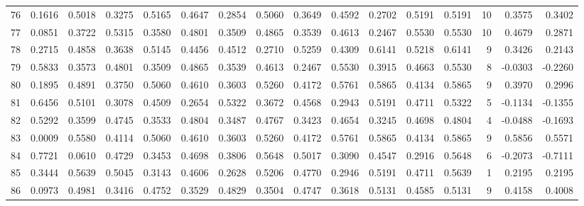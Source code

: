 \begin{tabular}{lrrrrrrrrrrrrrrr}
76  &      0.1616 &  0.5018 &  0.3275 &  0.5165 &  0.4647 &  0.2854 &  0.5060 &  0.3649 &  0.4592 &  0.2702 &   0.5191 &     0.5191 &     10 &                    0.3575 &                     0.3402 \\
77  &      0.0851 &  0.3722 &  0.5315 &  0.3580 &  0.4801 &  0.3509 &  0.4865 &  0.3539 &  0.4613 &  0.2467 &   0.5530 &     0.5530 &     10 &                    0.4679 &                     0.2871 \\
78  &      0.2715 &  0.4858 &  0.3638 &  0.5145 &  0.4456 &  0.4512 &  0.2710 &  0.5259 &  0.4309 &  0.6141 &   0.5218 &     0.6141 &      9 &                    0.3426 &                     0.2143 \\
79  &      0.5833 &  0.3573 &  0.4801 &  0.3509 &  0.4865 &  0.3539 &  0.4613 &  0.2467 &  0.5530 &  0.3915 &   0.4663 &     0.5530 &      8 &                   -0.0303 &                    -0.2260 \\
80  &      0.1895 &  0.4891 &  0.3750 &  0.5060 &  0.4610 &  0.3603 &  0.5260 &  0.4172 &  0.5761 &  0.5865 &   0.4134 &     0.5865 &      9 &                    0.3970 &                     0.2996 \\
81  &      0.6456 &  0.5101 &  0.3078 &  0.4509 &  0.2654 &  0.5322 &  0.3672 &  0.4568 &  0.2943 &  0.5191 &   0.4711 &     0.5322 &      5 &                   -0.1134 &                    -0.1355 \\
82  &      0.5292 &  0.3599 &  0.4745 &  0.3533 &  0.4804 &  0.3487 &  0.4767 &  0.3423 &  0.4654 &  0.3245 &   0.4698 &     0.4804 &      4 &                   -0.0488 &                    -0.1693 \\
83  &      0.0009 &  0.5580 &  0.4114 &  0.5060 &  0.4610 &  0.3603 &  0.5260 &  0.4172 &  0.5761 &  0.5865 &   0.4134 &     0.5865 &      9 &                    0.5856 &                     0.5571 \\
84  &      0.7721 &  0.0610 &  0.4729 &  0.3453 &  0.4698 &  0.3806 &  0.5648 &  0.5017 &  0.3090 &  0.4547 &   0.2916 &     0.5648 &      6 &                   -0.2073 &                    -0.7111 \\
85  &      0.3444 &  0.5639 &  0.5045 &  0.3143 &  0.4606 &  0.2628 &  0.5206 &  0.4770 &  0.2946 &  0.5191 &   0.4711 &     0.5639 &      1 &                    0.2195 &                     0.2195 \\
86  &      0.0973 &  0.4981 &  0.3416 &  0.4752 &  0.3529 &  0.4829 &  0.3504 &  0.4747 &  0.3618 &  0.5131 &   0.4585 &     0.5131 &      9 &                    0.4158 &                     0.4008 \\

\end{tabular}
